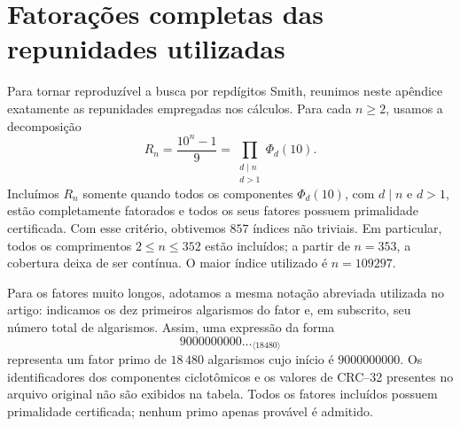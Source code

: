 \documentclass[11pt,a4paper]{article}
\begin{document}
	
\section{Fatorações completas das repunidades utilizadas}
\label{ap:fatoracoes-repunidades}

Para tornar reproduzível a busca por repdígitos Smith, reunimos neste
apêndice exatamente as repunidades empregadas nos cálculos. Para cada
\(n\geq2\), usamos a decomposição
\[
R_n=\frac{10^n-1}{9}
=\prod_{\substack{d\mid n\\ d>1}}\Phi_d(10).
\]
Incluímos \(R_n\) somente quando todos os componentes
\(\Phi_d(10)\), com \(d\mid n\) e \(d>1\), estão completamente
fatorados e todos os seus fatores possuem primalidade certificada.
Com esse critério, obtivemos \(857\) índices não triviais. Em
particular, todos os comprimentos \(2\leq n\leq352\) estão incluídos;
a partir de \(n=353\), a cobertura deixa de ser contínua. O maior
índice utilizado é \(n=109297\).

Para os fatores muito longos, adotamos a mesma notação abreviada
utilizada no artigo: indicamos os dez primeiros algarismos do fator e,
em subscrito, seu número total de algarismos. Assim, uma expressão da
forma
\[
9000000000\ldots_{\langle18480\rangle}
\]
representa um fator primo de \(18\,480\) algarismos cujo início é
\(9000000000\). Os identificadores dos componentes ciclotômicos e os
valores de CRC--32 presentes no arquivo original não são exibidos na
tabela. Todos os fatores incluídos possuem primalidade certificada;
nenhum primo apenas provável é admitido.

\providecommand{\Rfactor}[1]{\seqsplit{#1}}
\providecommand{\Rfactorpow}[2]{\seqsplit{#1}\(^{#2}\)}
\providecommand{\Rtimes}{\,\(\cdot\)\,}
\providecommand{\Rlong}[2]{%
  \(#1\ldots_{\langle #2\rangle}\)}
\end{document}
